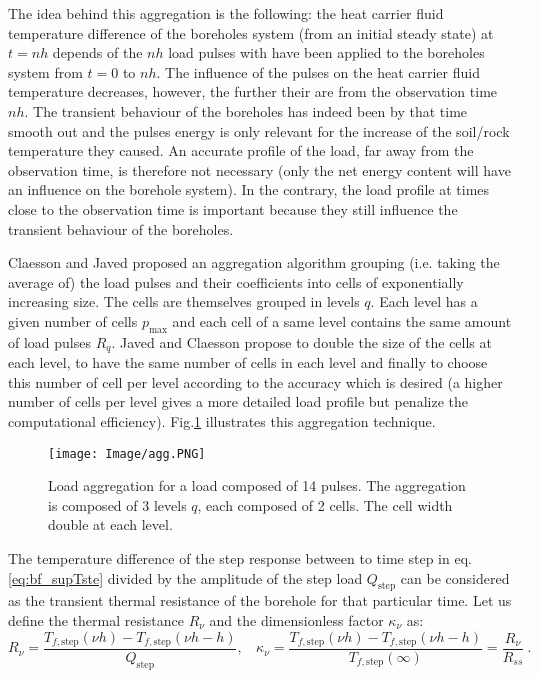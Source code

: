 \documentclass[a4paper,oneside,11pt]{report}
\begin{document}
{The idea behind this aggregation is the following: the heat carrier fluid temperature difference of the boreholes system (from an initial steady state) at $t=nh$ depends of the $nh$ load pulses with have been applied to the boreholes system from $t=0$ to $nh$. The influence of the pulses on the heat carrier fluid temperature decreases, however, the further their are from the observation time $nh$. The transient behaviour of the boreholes has indeed been by that time smooth out and the pulses energy is only relevant for the increase of the soil/rock temperature they caused. An accurate profile of the load, far away from the observation time, is therefore not necessary (only the net energy content will have an influence on the borehole system). In the contrary, the load profile at times close to the observation time is important because they still influence the transient behaviour of the boreholes.

Claesson and Javed proposed an aggregation algorithm grouping (i.e. taking the average of) the load pulses and their coefficients into cells of exponentially increasing size. The cells are themselves grouped in levels $q$. Each level has a given number of cells $p_{\text{max}}$ and each cell of a same level contains the same amount of load pulses $R_q$. Javed and Claesson propose to double the size of the cells at each level, to have the same number of cells in each level and finally to choose this number of cell per level according to the accuracy which is desired (a higher number of cells per level gives a more detailed load profile but penalize the computational efficiency). Fig.\ref{fig:bf_agg} illustrates this aggregation technique.
\begin{figure}[hbtp]
\centering
\texttt{[image: Image/agg.PNG]}
\caption{Load aggregation for a load composed of 14 pulses. The aggregation is composed of 3 levels $q$, each composed of 2 cells. The cell width double at each level.}
\label{fig:bf_agg}
\end{figure}

The temperature difference of the step response between to time step in eq.\ref{eq:bf_supTste} divided by the amplitude of the step load $Q_{\text{step}}$ can be considered as the transient thermal resistance of the borehole for that particular time. Let us define the  thermal resistance $R_{\nu}$ and the dimensionless factor $\kappa_{\nu}$ as:
\begin{equation} \label{eq:bf_RAndKap}
  R_{\nu} = \frac{T_{f,\text{step}}(\nu h) - T_{f,\text{step}}(\nu h - h)}{Q_{\text{step}}}, \ \ \ \ 
  \kappa_{\nu} = \frac{T_{f,\text{step}}(\nu h) - T_{f,\text{step}}(\nu h - h)}{T_{f,\text{step}}(\infty)} = \frac{R_{\nu}}{R_{ss}} \ .
\end{equation}

}
\end{document}

